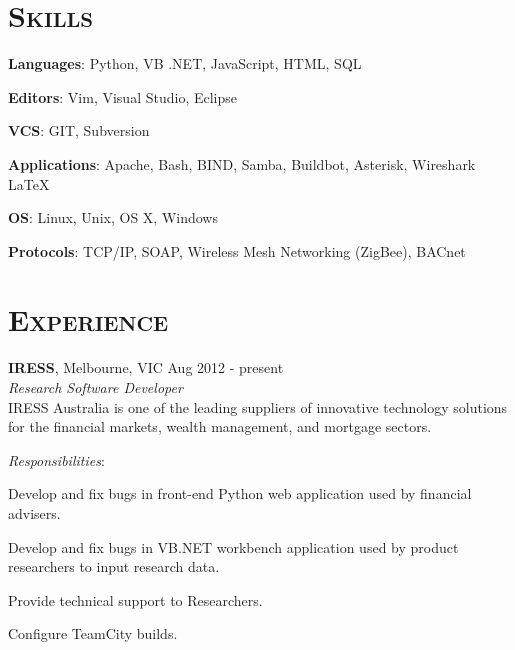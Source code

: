 \documentclass[line,margin]{res}
\begin{document}
    \address{ablack@fastmail.net}
    \address{0401 868 343}

    \begin{resume}
        \section{\textsc{Skills}}
        \begin{list}{}{\leftmargin=1em \itemsep=-2pt}
            \item{\textbf{Languages}: Python, VB .NET, JavaScript, HTML, SQL}
            \item{\textbf{Editors}: Vim, Visual Studio, Eclipse}
            \item{\textbf{VCS}: GIT, Subversion}
            \item{\textbf{Applications}: Apache, Bash, BIND, Samba, Buildbot, Asterisk, Wireshark \LaTeX}
            \item{\textbf{OS}: Linux, Unix, OS X, Windows}
            \item{\textbf{Protocols}: TCP/IP, SOAP, Wireless Mesh Networking (ZigBee), BACnet}
        \end{list}

        \section{\textsc{Experience}} \textbf{IRESS}, Melbourne, VIC \hfill Aug 2012 - present \\
        \textit{Research Software Developer}\\
        IRESS Australia is one of the leading suppliers of innovative technology solutions for the financial markets, wealth management, and mortgage sectors.

        \textit{Responsibilities}:
        \begin{list}{}{\leftmargin=1em \itemsep=-2pt}
            \item{Develop and fix bugs in front-end Python web application used by financial advisers.}
            \item{Develop and fix bugs in VB.NET workbench application used by product researchers to input research data.}
            \item{Provide technical support to Researchers.}
            \item{Configure TeamCity builds.}
        \end{list}


\end{resume}
\end{document}
